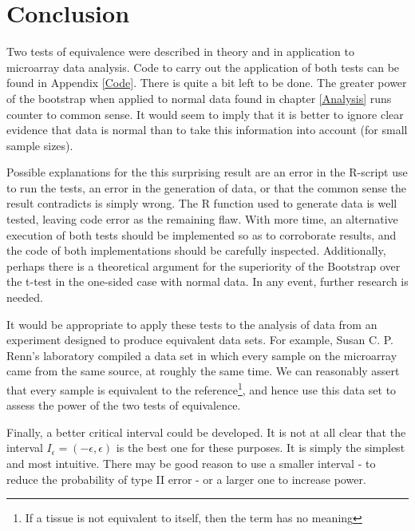 \chapter{Conclusion}
Two tests of equivalence were described in theory and in application to microarray data analysis. Code to carry out the application of both tests can be found in Appendix \ref{Code}. There is quite a bit left to be done. The greater power of the bootstrap when applied to normal data found in chapter \ref{Analysis} runs counter to common sense. It would seem to imply that it is better to ignore clear evidence that data is normal than to take this information into account (for small sample sizes).

 Possible explanations for the this surprising result are an error in the R-script use to run the tests, an error in the generation of data, or that the common sense the result contradicts is simply wrong. The R function used to generate data is well tested, leaving code error as the remaining flaw. With more time, an alternative execution of both tests should be implemented so as to corroborate results, and the code of both implementations should be carefully inspected. Additionally, perhaps there is a theoretical argument for the superiority of the Bootstrap over the t-test in the one-sided case with normal data. In any event, further research is needed.
 
It would be appropriate to apply these tests to the analysis of data from an experiment designed to produce equivalent data sets. For example, Susan C. P. Renn's laboratory compiled a data set in which every sample on the microarray came from the same source, at roughly the same time. We can reasonably assert that every sample is equivalent to the reference\footnote{If a tissue is not equivalent to itself, then the term has no meaning}, and hence use this data set to assess the power of the two tests of equivalence.

Finally, a better critical interval could be developed. It is not at all clear that the interval $I_\epsilon = (-\epsilon, \epsilon)$ is the best one for these purposes. It is simply the simplest and most intuitive. There may be good reason to use a smaller interval - to reduce the probability of type II error - or a larger one to increase power. 